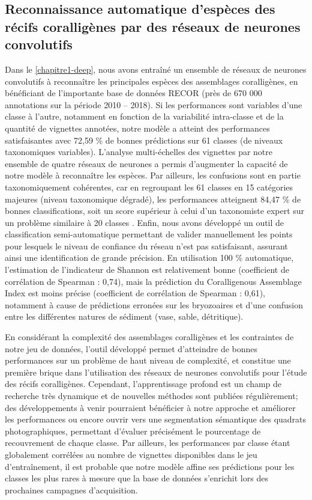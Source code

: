 \subsection{Reconnaissance automatique d’espèces des récifs coralligènes par des réseaux de neurones convolutifs}

Dans le \autoref{chapitre1-deep}, nous avons entraîné un ensemble de réseaux de neurones convolutifs à reconnaître les principales espèces des assemblages coralligènes, en bénéficiant de l’importante base de données RECOR (près de 670 000 annotations sur la période 2010 – 2018). Si les performances sont variables d’une classe à l’autre, notamment en fonction de la variabilité intra-classe et de la quantité de vignettes annotées, notre modèle a atteint des performances satisfaisantes avec 72,59 \% de bonnes prédictions sur 61 classes (de niveaux taxonomiques variables). L’analyse multi-échelles des vignettes par notre ensemble de quatre réseaux de neurones a permis d’augmenter la capacité de notre modèle à reconnaître les espèces. Par ailleurs, les confusions sont en partie taxonomiquement cohérentes, car en regroupant les 61 classes en 15 catégories majeures (niveau taxonomique dégradé), les performances atteignent 84,47 \% de bonnes classifications, soit un score supérieur à celui d’un taxonomiste expert sur un problème similaire à 20 classes \citep{beijbom_towards_2015}. Enfin, nous avons développé un outil de classification semi-automatique permettant de valider manuellement les points pour lesquels le niveau de confiance du réseau n’est pas satisfaisant, assurant ainsi une identification de grande précision. En utilisation 100 \% automatique, l’estimation de l’indicateur de Shannon est relativement bonne (coefficient de corrélation de Spearman : 0,74), mais la prédiction du Coralligenous Assemblage Index \citep{deter_preliminary_2012} est moins précise (coefficient de corrélation de Spearman : 0,61), notamment à cause de prédictions erronées sur les bryozoaires et d’une confusion entre les différentes natures de sédiment (vase, sable, détritique).

En considérant la complexité des assemblages coralligènes et les contraintes de notre jeu de données, l’outil développé permet d’atteindre de bonnes performances sur un problème de haut niveau de complexité, et constitue une première brique dans l’utilisation des réseaux de neurones convolutifs pour l’étude des récifs coralligènes. Cependant, l’apprentissage profond est un champ de recherche très dynamique et de nouvelles méthodes sont publiées régulièrement; des développements à venir pourraient bénéficier à notre approche et améliorer les performances ou encore ouvrir vers une segmentation sémantique des quadrats photographiques, permettant d’évaluer précisément le pourcentage de recouvrement de chaque classe. Par ailleurs, les performances par classe étant globalement corrélées au nombre de vignettes disponibles dans le jeu d’entraînement, il est probable que notre modèle affine ses prédictions pour les classes les plus rares à mesure que la base de données s’enrichit lors des prochaines campagnes d’acquisition.

